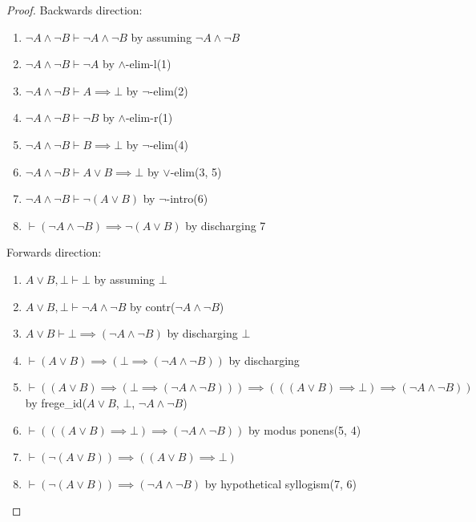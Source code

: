 \begin{proof}
Backwards direction:
\begin{enumerate}
\item $\neg A\land\neg B\vdash \neg A\land\neg B$ by assuming $\neg A\land\neg B$%
\item $\neg A\land\neg B\vdash \neg A$ by $\land$-elim-l(1)%
\item $\neg A\land\neg B\vdash A\implies\bot$ by $\neg$-elim(2)%
\item $\neg A\land\neg B\vdash\neg B$ by $\land$-elim-r(1)%
\item $\neg A\land\neg B\vdash B\implies\bot$ by $\neg$-elim(4)%
\item $\neg A\land\neg B\vdash A\lor B\implies\bot$ by $\lor$-elim(3, 5)%
\item $\neg A\land\neg B\vdash\neg(A\lor B)$ by $\neg$-intro(6)%
\item $\vdash(\neg A\land\neg B)\implies\neg(A\lor B)$ by discharging 7
\end{enumerate}
Forwards direction:
\begin{enumerate}
\item $A\lor B,\bot\vdash\bot$ by assuming $\bot$%
\item $A\lor B,\bot\vdash\neg A\land\neg B$ by contr($\neg A\land\neg B$)%
\item $A\lor B\vdash\bot\implies(\neg A\land\neg B)$ by discharging $\bot$%
\item $\vdash(A\lor B)\implies(\bot\implies(\neg A\land\neg B))$ by discharging%
\item $\vdash((A\lor B)\implies(\bot\implies(\neg A\land\neg B)))\implies(((A\lor B)\implies\bot)\implies(\neg A\land\neg B))$
  by {\Tt{}frege{\_}id\nwendquote}($A\lor B$, $\bot$, $\neg A\land\neg B$)%
\item $\vdash(((A\lor B)\implies\bot)\implies(\neg A\land\neg B))$ by
  modus ponens(5, 4)%
\item $\vdash(\neg(A\lor B))\implies((A\lor B)\implies\bot)$%
\item $\vdash(\neg(A\lor B))\implies(\neg A\land\neg B)$ by
  hypothetical syllogism(7, 6)\qedhere
\end{enumerate}
\end{proof}

